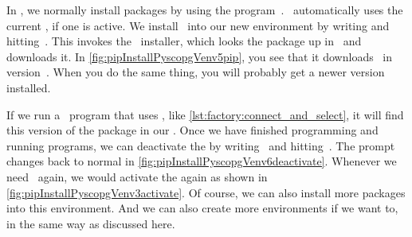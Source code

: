 In \python, we normally install packages by using the program~\pip.
\pip~automatically uses the current , if one is active.
We install \psycopg\ into our new environment by writing  and hitting~\keys{\enter}.
This invokes the \pip\ installer, which looks the package up in \pypi\ and downloads it.
In \cref{fig:pipInstallPyscopgVenv5pip}, you see that it downloads \psycopg\ in version~.
When you do the same thing, you will probably get a newer version installed.

If we run a \python\ program that uses \psycopg, like \cref{lst:factory:connect_and_select}, it will find this version of the package in our .
Once we have finished programming and running programs, we can deactivate the  by writing~ and hitting~\keys{\enter}.
The prompt changes back to normal in \cref{fig:pipInstallPyscopgVenv6deactivate}.
Whenever we need \psycopg\ again, we would activate the  again as shown in \cref{fig:pipInstallPyscopgVenv3activate}.
Of course, we can also install more packages into this environment.
And we can also create more environments if we want to, in the same way as discussed here.%
\FloatBarrier%
\endhsection%
%
%
\label{sec:cloningExamplesRepoAndInstallingPsycopgUnderPyCharm}%
%
